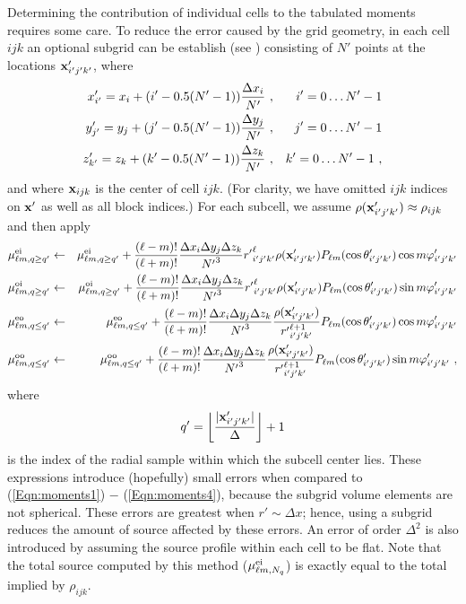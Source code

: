 Determining the contribution of individual
cells to the tabulated moments requires some care.  To reduce the error
caused by the grid geometry, in each cell $ijk$
an optional subgrid can be establish (see )
consisting of $N'$ points at the locations
${\bf x}'_{i'j'k'}$, where
\begin{eqnarray}
x'_{i'} = x_i + (i'-0.5(N'-1)){\Delta x_i\over {N'}}\ ,&&
  i' = 0\ldots {N'}-1 \\
y'_{j'} = y_j + (j'-0.5(N'-1)){\Delta y_j\over {N'}}\ ,&&
  j' = 0\ldots {N'}-1 \\
z'_{k'} = z_k + (k'-0.5(N'-1)){\Delta z_k\over {N'}}\ ,&&
  k' = 0\ldots {N'}-1 \ ,
\end{eqnarray}
and where ${\bf x}_{ijk}$ is the center of cell $ijk$.  (For clarity, we have
omitted $ijk$ indices on ${\bf x}'$ as well as all block indices.)
For each subcell, we assume $\rho({\bf x}'_{i'j'k'})\approx\rho_{ijk}$
and then apply
\begin{eqnarray}
\label{Eqn:discmoments1}
\mu^{\rm ei}_{\ell m,q\ge q'} &\leftarrow& \mu^{\rm ei}_{\ell m,q\ge q'} +
  {(\ell-m)!\over (\ell+m)!} {\Delta x_i\Delta y_j\Delta z_k\over {N'}^3}
  {r'}_{i'j'k'}^\ell \rho({\bf x}'_{i'j'k'}) P_{\ell m}(\cos\theta'_{i'j'k'})
  \cos m\varphi'_{i'j'k'} \\
\mu^{\rm oi}_{\ell m,q\ge q'} &\leftarrow& \mu^{\rm oi}_{\ell m,q\ge q'} +
  {(\ell-m)!\over (\ell+m)!} {\Delta x_i\Delta y_j\Delta z_k\over {N'}^3}
  {r'}_{i'j'k'}^\ell \rho({\bf x}'_{i'j'k'}) P_{\ell m}(\cos\theta'_{i'j'k'})
  \sin m\varphi'_{i'j'k'} \\
\mu^{\rm eo}_{\ell m,q\le q'} &\leftarrow& \mu^{\rm eo}_{\ell m,q\le q'} +
  {(\ell-m)!\over (\ell+m)!} {\Delta x_i\Delta y_j\Delta z_k\over {N'}^3}
  {\rho({\bf x}'_{i'j'k'})\over {r'}_{i'j'k'}^{\ell+1}}
  P_{\ell m}(\cos\theta'_{i'j'k'})
  \cos m\varphi'_{i'j'k'} \\
\label{Eqn:discmoments4}
\mu^{\rm oo}_{\ell m,q\le q'} &\leftarrow& \mu^{\rm oo}_{\ell m,q\le q'} +
  {(\ell-m)!\over (\ell+m)!} {\Delta x_i\Delta y_j\Delta z_k\over {N'}^3}
  {\rho({\bf x}'_{i'j'k'})\over {r'}_{i'j'k'}^{\ell+1}}
  P_{\ell m}(\cos\theta'_{i'j'k'}) \sin m\varphi'_{i'j'k'}
  \ ,
\end{eqnarray}
where
\begin{equation}
q' = \left\lfloor{|{\bf x}'_{i'j'k'} }| \over {\Delta}
     \right\rfloor + 1
\end{equation}
is the index of the radial sample within which the subcell center lies.
These expressions introduce (hopefully) small errors when compared to
(\eqref{Eqn:moments1}) $-$ (\ref{Eqn:moments4}), because the
subgrid volume elements are not spherical. These
errors are greatest when $r' \sim \Delta x$; hence, using a subgrid
reduces the amount of source affected by these errors.
An error of order $\Delta^2$ is also introduced by assuming the source
profile within each cell to be flat.
Note that the total source computed by this method ($\mu^{\rm ei}_{\ell m,N_q}$)
is exactly equal to the total implied by $\rho_{ijk}$.

